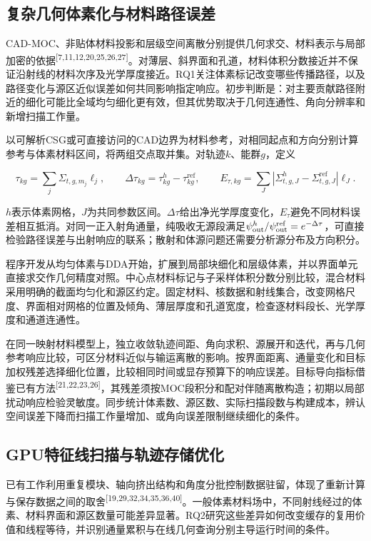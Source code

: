 \documentclass[UTF8, zihao=-4, fontset=none, a4paper]{ctexart}
\newcommand{\upcite}[1]{\textsuperscript{[#1]}}
\begin{document}
\subsection{复杂几何体素化与材料路径误差}

CAD-MOC、非贴体材料投影和层级空间离散分别提供几何求交、材料表示与局部加密的依据\upcite{7,11,12,20,25,26,27}。对薄层、斜界面和孔道，材料体积分数接近并不保证沿射线的材料次序及光学厚度接近。RQ1关注体素标记改变哪些传播路径，以及路径变化与源区近似误差如何共同影响指定响应。初步判断是：对主要贡献路径附近的细化可能比全域均匀细化更有效，但其优势取决于几何连通性、角向分辨率和新增扫描工作量。

以可解析CSG或可直接访问的CAD边界为材料参考，对相同起点和方向分别计算参考与体素材料区间，将两组交点取并集。对轨迹\(k\)、能群\(g\)，定义

\begin{equation}
\tau_{kg}=\sum_j\Sigma_{t,g,m_j}\ell_j,\qquad
\Delta\tau_{kg}=\tau^{h}_{kg}-\tau^{\mathrm{ref}}_{kg},\qquad
E_{\tau,kg}=\sum_{J}\left|\Sigma^{h}_{t,g,J}-\Sigma^{\mathrm{ref}}_{t,g,J}\right|\ell_J.
\label{eq:patherror}
\end{equation}

\(h\)表示体素网格，\(J\)为共同参数区间。\(\Delta\tau\)给出净光学厚度变化，\(E_\tau\)避免不同材料误差相互抵消。对同一正入射角通量，纯吸收无源段满足\(\psi^h_{\rm out}/\psi^{\rm ref}_{\rm out}=e^{-\Delta\tau}\)，可直接检验路径误差与出射响应的联系；散射和体源问题还需要分析源分布及方向积分。

程序开发从均匀体素与DDA开始，扩展到局部块细化和层级体素，并以界面单元直接求交作几何精度对照。中心点材料标记与子采样体积分数分别比较，混合材料采用明确的截面均匀化和源区约定。固定材料、核数据和射线集合，改变网格尺度、界面相对网格的位置及倾角、薄层厚度和孔道宽度，检查逐材料段长、光学厚度和通道连通性。

在同一映射材料模型上，独立收敛轨迹间距、角向求积、源展开和迭代，再与几何参考响应比较，可区分材料近似与输运离散的影响。按界面距离、通量变化和目标加权残差选择细化位置，比较相同时间或显存预算下的响应误差。目标导向指标借鉴已有方法\upcite{21,22,23,26}，其残差须按MOC段积分和配对伴随离散构造；初期以局部扰动响应检验灵敏度。同步统计体素数、源区数、实际扫描段数与构建成本，辨认空间误差下降而扫描工作量增加、或角向误差限制继续细化的条件。

\subsection{GPU特征线扫描与轨迹存储优化}

已有工作利用重复模块、轴向挤出结构和角度分批控制数据驻留，体现了重新计算与保存数据之间的取舍\upcite{19,29,32,34,35,36,40}。一般体素材料场中，不同射线经过的体素、材料界面和源区数量可能差异显著。RQ2研究这些差异如何改变缓存的复用价值和线程等待，并识别通量累积与在线几何查询分别主导运行时间的条件。
\end{document}
